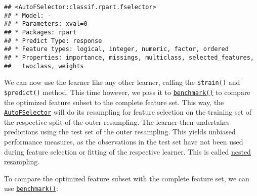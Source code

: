 \documentclass[
]{scrbook}
\newenvironment{Shaded}{\begin{snugshade}}{\end{snugshade}}
\newcommand{\AttributeTok}[1]{\textcolor[rgb]{0.77,0.63,0.00}{#1}}
\newcommand{\DecValTok}[1]{\textcolor[rgb]{0.00,0.00,0.81}{#1}}
\newcommand{\FunctionTok}[1]{\textcolor[rgb]{0.00,0.00,0.00}{#1}}
\newcommand{\NormalTok}[1]{#1}
\newcommand{\OtherTok}[1]{\textcolor[rgb]{0.56,0.35,0.01}{#1}}
\newcommand{\SpecialCharTok}[1]{\textcolor[rgb]{0.00,0.00,0.00}{#1}}
\newcommand{\StringTok}[1]{\textcolor[rgb]{0.31,0.60,0.02}{#1}}
\renewenvironment{Shaded} {\begin{snugshade}\small} {\end{snugshade}}
\begin{document}
\begin{Shaded}
\end{Shaded}

\begin{verbatim}
## <AutoFSelector:classif.rpart.fselector>
## * Model: -
## * Parameters: xval=0
## * Packages: rpart
## * Predict Type: response
## * Feature types: logical, integer, numeric, factor, ordered
## * Properties: importance, missings, multiclass, selected_features,
##   twoclass, weights
\end{verbatim}

We can now use the learner like any other learner, calling the \texttt{\$train()} and \texttt{\$predict()} method.
This time however, we pass it to \href{https://mlr3.mlr-org.com/reference/benchmark.html}{\texttt{benchmark()}} to compare the optimized feature subset to the complete feature set.
This way, the \href{https://mlr3fselect.mlr-org.com/reference/AutoFSelector.html}{\texttt{AutoFSelector}} will do its resampling for feature selection on the training set of the respective split of the outer resampling.
The learner then undertakes predictions using the test set of the outer resampling.
This yields unbiased performance measures, as the observations in the test set have not been used during feature selection or fitting of the respective learner.
This is called \protect\hyperlink{nested-resampling}{nested resampling}.

To compare the optimized feature subset with the complete feature set, we can use \href{https://mlr3.mlr-org.com/reference/benchmark.html}{\texttt{benchmark()}}:
\end{document}
